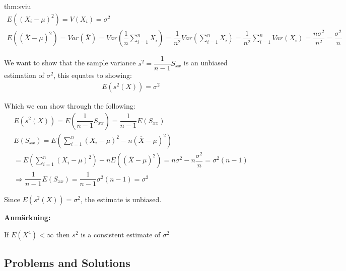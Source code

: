 \begin{prf}{thm:sviu}
\begin{equation*}
\begin{gathered}
      E((X_i-\mu)^2) = V(X_i) = \sigma^2\\
      E((\overline{X}-\mu)^2) = Var(\overline{X}) = Var\left(\dfrac{1}{n}\sum_{i=1}^{n}X_i\right) = \dfrac{1}{n^2}Var\left(\sum_{i=1}^{n}X_i\right) = \dfrac{1}{n^2}\sum_{i=1}^{n}Var(X_i) = \dfrac{n\sigma^2}{n^2} = \dfrac{\sigma^2}{n}
    \end{gathered}
  \end{equation*}
  \par\bigskip
  \noindent We want to show that the sample variance $s^2 = \dfrac{1}{n-1}S_{xx}$ is an unbiased estimation of $\sigma^2$, this equates to showing:
  \begin{equation*}
    \begin{gathered}
      E(s^2(X)) = \sigma^2
    \end{gathered}
  \end{equation*}
  \par\bigskip
  \noindent Which we can show through the following:
  \begin{equation*}
    \begin{gathered}
      E(s^2(X)) = E\left(\dfrac{1}{n-1}S_{xx}\right) = \dfrac{1}{n-1}E(S_{xx})\\
      E(S_{xx}) = E\left(\sum_{i=1}^{n}(X_i-\mu)^2-n(\overline{X}-\mu)^2\right)\\
    = E\left(\sum_{i=1}^{n}(X_i-\mu)^2\right)-nE\left((\overline{X}-\mu)^2\right) = n\sigma^2-n\dfrac{\sigma^2}{n} = \sigma^2(n-1)\\
    \Rightarrow \dfrac{1}{n-1}E(S_{xx}) = \dfrac{1}{n-1}\sigma^2(n-1) = \sigma^2
    \end{gathered}
  \end{equation*}
  \par\bigskip
  \noindent Since $E(s^2(X)) = \sigma^2$, the estimate is unbiased.\par 
\end{prf}
\par\bigskip
\noindent\textbf{Anmärkning:}\par
\noindent If $E(X^4)<\infty$ then  $s^2$ is a consistent estimate of $\sigma^2$ 

\par\bigskip
\subsection{Problems and Solutions}\hfill\\\par
